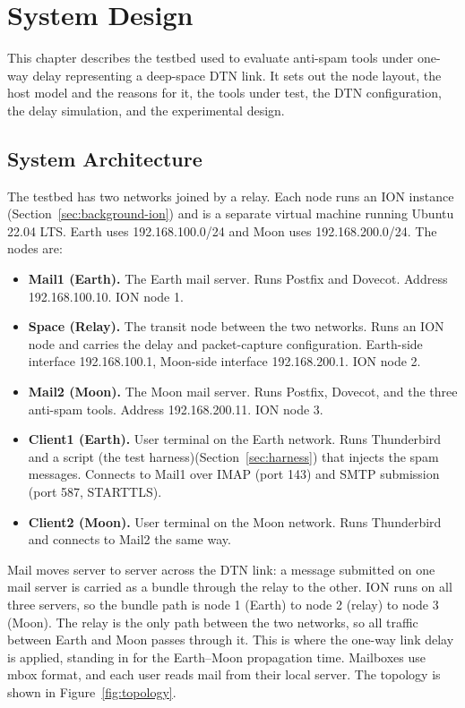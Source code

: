 \chapter{System Design}


This chapter describes the testbed used to evaluate anti-spam tools under one-way delay representing a deep-space DTN link. It sets out the node layout, the host model and the reasons for it, the tools under test, the DTN configuration, the delay simulation, and the experimental design.

\section{System Architecture}
\label{sec:arch}

The testbed has two networks joined by a relay. Each node runs an ION instance (Section~\ref{sec:background-ion}) and is a separate virtual machine running Ubuntu 22.04 LTS. Earth uses 192.168.100.0/24 and Moon uses 192.168.200.0/24. The nodes are:

\begin{itemize}
  \item \textbf{Mail1 (Earth).} The Earth mail server. Runs Postfix and Dovecot. Address 192.168.100.10.
  ION node 1.
  \item \textbf{Space (Relay).} The transit node between the two networks. Runs an
  ION node and carries the delay and packet-capture configuration. Earth-side
  interface 192.168.100.1, Moon-side interface 192.168.200.1. ION node 2.
  \item \textbf{Mail2 (Moon).} The Moon mail server. Runs Postfix, Dovecot, and
  the three anti-spam tools. Address 192.168.200.11. ION node 3.
  \item \textbf{Client1 (Earth).} User terminal on the Earth network. Runs Thunderbird and a script (the test harness)(Section~\ref{sec:harness}) that injects the spam messages. Connects to Mail1 over IMAP (port 143) and SMTP submission (port 587, STARTTLS).
  \item \textbf{Client2 (Moon).} User terminal on the Moon network. Runs
  Thunderbird and connects to Mail2 the same way.
\end{itemize}

Mail moves server to server across the DTN link: a message submitted on one mail server is carried as a bundle through the relay to the other. ION runs on all three servers, so the bundle path is node 1 (Earth) to node 2 (relay) to node 3 (Moon). The relay is the only path between the two networks, so all traffic between Earth and Moon passes through it. This is where the one-way link delay is applied, standing in for the Earth–Moon propagation time. Mailboxes use mbox format, and each user reads mail from their local server. The topology is shown in Figure~\ref{fig:topology}.

